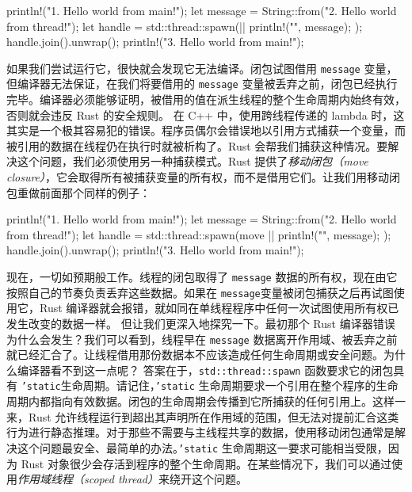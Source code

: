\begin{codebox}[rust]
println!("1. Hello world from main!");
let message = String::from("2. Hello world from thread!");
let handle = std::thread::spawn(|| {
    println!("{}", message);
});
handle.join().unwrap();
println!("3. Hello world from main!");
\end{codebox}
如果我们尝试运行它，很快就会发现它无法编译。闭包试图借用 \texttt{message} 变量，但编译器无法保证，在我们将要借用的 \texttt{message} 变量被丢弃之前，闭包已经执行完毕。编译器必须能够证明，被借用的值在派生线程的整个生命周期内始终有效，否则就会违反 Rust 的安全规则。
\label{idx:idx_2fd9d805}
在 C++ 中，使用跨线程传递的 lambda 时，这其实是一个极其容易犯的错误。程序员偶尔会错误地以引用方式捕获一个变量，而被引用的数据在线程仍在执行时就被析构了。Rust 会帮我们捕获这种情况。要解决这个问题，我们必须使用另一种捕获模式。Rust 提供了\emph{移动闭包（move closure）}，它会取得所有被捕获变量的所有权，而不是借用它们。让我们用移动闭包重做前面那个同样的例子：
\begin{codebox}[rust]
println!("1. Hello world from main!");
let message = String::from("2. Hello world from thread!");
let handle = std::thread::spawn(move || {
    println!("{}", message);
});
handle.join().unwrap();
println!("3. Hello world from main!");
\end{codebox}
现在，一切如预期般工作。线程的闭包取得了 \texttt{message} 数据的所有权，现在由它按照自己的节奏负责丢弃这些数据。如果在 \texttt{message}变量被闭包捕获之后再试图使用它，Rust 编译器就会报错，就如同在单线程程序中任何一次试图使用所有权已发生改变的数据一样。
但让我们更深入地探究一下。最初那个 Rust 编译器错误为什么会发生？我们可以看到，线程早在 \texttt{message} 数据离开作用域、被丢弃之前就已经汇合了。让线程借用那份数据本不应该造成任何生命周期或安全问题。为什么编译器看不到这一点呢？
\label{idx:idx_c23e452d}
答案在于，\texttt{std::\allowbreak{}thread::\allowbreak{}spawn} 函数要求它的闭包具有 \texttt{'static}生命周期。请记住，\texttt{'static} 生命周期要求一个引用在整个程序的生命周期内都指向有效数据。闭包的生命周期会传播到它所捕获的任何引用上。这样一来，Rust 允许线程运行到超出其声明所在作用域的范围，但无法对提前汇合这类行为进行静态推理。对于那些不需要与主线程共享的数据，使用移动闭包通常是解决这个问题最安全、最简单的办法。\texttt{'static} 生命周期这一要求可能相当受限，因为 Rust 对象很少会存活到程序的整个生命周期。在某些情况下，我们可以通过使用\emph{作用域线程（scoped thread）}来绕开这个问题。
